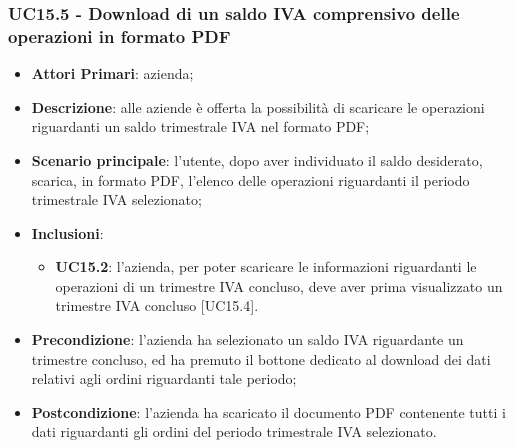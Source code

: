 \subsubsection{UC15.5 - Download di un saldo IVA comprensivo delle operazioni in formato PDF}
\begin{itemize}
	\item \textbf{Attori Primari}: azienda;
	\item \textbf{Descrizione}: alle aziende è offerta la possibilità di scaricare le operazioni riguardanti un saldo trimestrale IVA nel formato PDF;
	\item \textbf{Scenario principale}: l'utente, dopo aver individuato il saldo desiderato, scarica, in formato PDF, l'elenco delle operazioni riguardanti il periodo trimestrale IVA selezionato;
	\item \textbf{Inclusioni}:
	\begin{itemize}
		\item \textbf{UC15.2}: l'azienda, per poter scaricare le informazioni riguardanti le operazioni di un trimestre IVA concluso, deve aver prima visualizzato un trimestre IVA concluso [UC15.4].
	\end{itemize}
	\item \textbf{Precondizione}: l'azienda ha selezionato un saldo IVA riguardante un trimestre concluso, ed ha premuto il bottone dedicato al download dei dati relativi agli ordini riguardanti tale periodo;
	\item \textbf{Postcondizione}: l'azienda ha scaricato il documento PDF contenente tutti i dati riguardanti gli ordini del periodo trimestrale IVA selezionato.
\end{itemize} 

